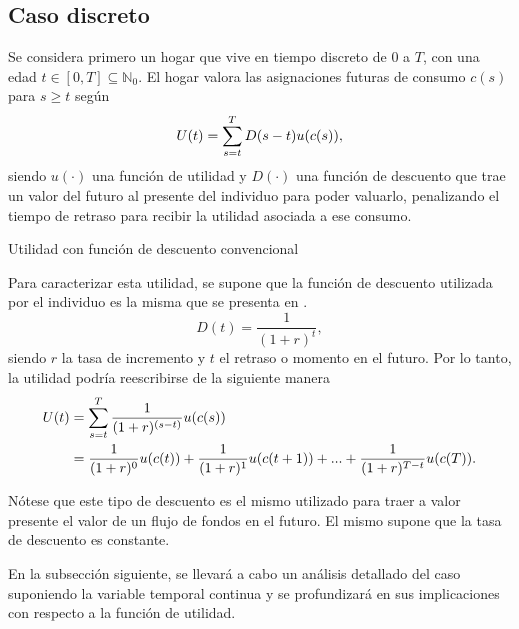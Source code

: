\subsection{Caso discreto}
Se considera primero un hogar que vive en tiempo discreto de $0$ a $T$, con una edad $t \in [0, T] \subseteq  \mathbb{N}_0$. El hogar valora las asignaciones futuras de consumo $c(s)$ para $s \geq t$ según 
\begin{equation*}
  U(t)=\displaystyle \sum_{s=t}^T{D(s-t)u(c(s))},
\end{equation*}
%
siendo $u(\cdot)$ una función de utilidad y $D(\cdot)$ una función de descuento que trae un valor del futuro al presente del individuo para poder valuarlo, penalizando el tiempo de retraso para recibir la utilidad asociada a ese consumo. 
%
\begin{exmpl}\label{ex 1}
Utilidad con función de descuento convencional 

Para caracterizar esta utilidad, se supone que la función de descuento utilizada por el individuo es la misma que se presenta en \parencite{Samuelson37}.
$$D(t)= \dfrac{1}{(1+r)^t},$$
siendo $r$ la tasa de incremento y $t$ el retraso o momento en el futuro.
%
Por lo tanto, la utilidad podría reescribirse de la siguiente manera
%
\begin{align*}
    U(t)&=\displaystyle \sum_{s=t}^T{\dfrac{1}{(1+r)^{(s-t)}}u(c(s))} \\ 
        &= \dfrac{1}{(1+r)^{0}}u(c(t))+\dfrac{1}{(1+r)^{1}}u(c(t+1))+...+\dfrac{1}{(1+r)^{T-t}}u(c(T)).
\end{align*}

Nótese que este tipo de descuento es el mismo utilizado para traer a valor presente el valor de un flujo de fondos en el futuro. El mismo supone que la tasa de descuento es constante.
\end{exmpl}

En la subsección siguiente, se llevará a cabo un análisis detallado del caso suponiendo la variable temporal continua y se profundizará en sus implicaciones con respecto a la función de utilidad.

